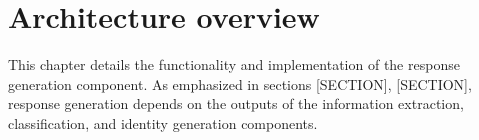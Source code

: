\chapter{Architecture overview}

This chapter details the functionality and implementation of the response generation component. As emphasized in sections [SECTION], [SECTION], response generation depends on the outputs of the information extraction, classification, and identity generation components. 

